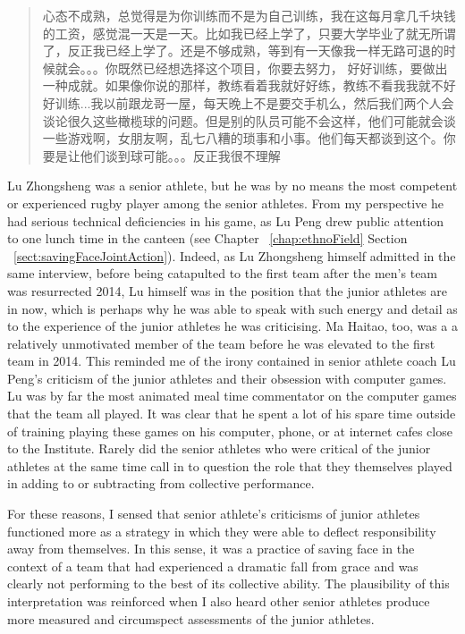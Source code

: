 \begin{CJK}{UTF8}{gbsn}
  \begin{quotation}
    心态不成熟，总觉得是为你训练而不是为自己训练，我在这每月拿几千块钱的工资，感觉混一天是一天。比如我已经上学了，只要大学毕业了就无所谓了，反正我已经上学了。还是不够成熟，等到有一天像我一样无路可退的时候就会。。。你既然已经想选择这个项目，你要去努力， 好好训练，要做出一种成就。如果像你说的那样，教练看着我就好好练，教练不看我我就不好好训练...我以前跟龙哥一屋，每天晚上不是要交手机么，然后我们两个人会谈论很久这些橄榄球的问题。但是别的队员可能不会这样，他们可能就会谈一些游戏啊，女朋友啊，乱七八糟的琐事和小事。他们每天都谈到这个。你要是让他们谈到球可能。。。反正我很不理解
  \end{quotation}


Lu Zhongsheng was a senior athlete, but he was by no means the most competent or experienced rugby player among the senior athletes.  From my perspective he had serious technical deficiencies in his game, as Lu Peng drew public attention to one lunch time in the canteen (see Chapter ~\ref{chap:ethnoField} Section ~\ref{sect:savingFaceJointAction}).  Indeed, as Lu Zhongsheng himself admitted in the same interview, before being catapulted to the first team after the men's team was resurrected 2014, Lu himself was in the position that the junior athletes are in now, which is perhaps why he was able to speak with such energy and detail as to the experience of the junior athletes he was criticising.  Ma Haitao, too, was a a relatively unmotivated member of the team before he was elevated to the first team in 2014.  This reminded me of the irony contained in senior athlete coach Lu Peng's criticism of the junior athletes and their obsession with computer games.  Lu was by far the most animated meal time commentator on the computer games that the team all played. It was clear that he spent a lot of his spare time outside of training playing these games on his computer, phone, or at internet cafes close to the Institute.  Rarely did the senior athletes who were critical of the junior athletes at the same time call in to question the role that they themselves played in adding to or subtracting from collective performance.

For these reasons, I sensed that senior athlete's criticisms of junior athletes functioned more as a strategy in which they were able to deflect responsibility away from themselves.  In this sense, it was a practice of saving face in the context of a team that had experienced a dramatic fall from grace and was clearly not performing to the best of its collective ability.  The plausibility of this interpretation was reinforced when I also heard other senior athletes produce more measured and circumspect assessments of the junior athletes.


\end{CJK}
